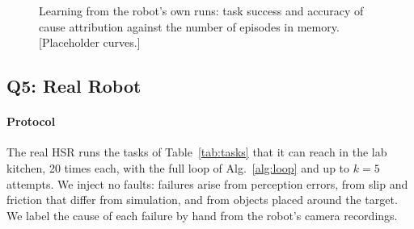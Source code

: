 \documentclass[letterpaper, 10 pt, conference]{ieeeconf}
\newcommand{\dummystyle}{\color{dummy}}
\newcommand{\dummystyle}{}
\newcommand{\dummy}[1]{{\dummystyle #1}}
\newcommand{\dummynote}[1]{{\dummystyle[#1]}}
\newcommand{\dummynote}[1]{}
\begin{document}
\begin{figure}[t]
  \centering
  \newcommand{\learnpanel}[4]{%
    \begin{scope}[xshift=#1cm]
      \draw[black!30] (0,0) rectangle (500,1);
      \draw[black!12] (0,0.5) -- (500,0.5);
      \draw[thick, blue!70!black] plot coordinates {#3};
      \draw[thick, dashed, red!70!black] plot coordinates {#4};
      \node[above] at (250,1) {#2};
      \node[below] at (0,0) {0};
      \node[below] at (500,0) {500};
    \end{scope}}
  \caption{Learning from the robot's own runs: task success and accuracy of
  cause attribution against the number of episodes in memory.
  \dummynote{Placeholder curves.}}
  \label{fig:learning}
\end{figure}

\subsection{Q5: Real Robot}
\label{sec:exp-real}

\paragraph*{Protocol}
The real HSR runs the tasks of Table~\ref{tab:tasks} that it can reach in the
lab kitchen, \dummy{20} times each, with the full loop of
Alg.~\ref{alg:loop} and up to \dummy{$k = 5$} attempts. We inject no faults:
failures arise from perception errors, from slip and friction that differ from
simulation, and from objects placed around the target. We label the cause of
each failure by hand from the robot's camera recordings.
\end{document}
